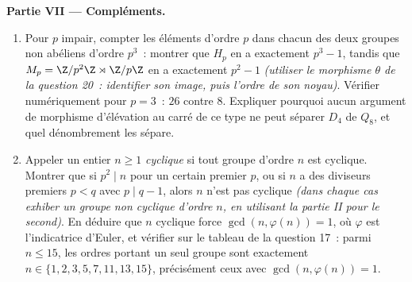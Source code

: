 \begin{problem}
\medskip
\noindent\textbf{Partie VII --- Compléments.}
\begin{enumerate}[resume]
  \item Pour $p$ impair, compter les éléments d'ordre $p$ dans
        chacun des deux groupes non abéliens d'ordre $p^3$~:
        montrer que $H_p$ en a exactement $p^3 - 1$, tandis que
        $M_p = \Z/p^2\Z \rtimes \Z/p\Z$ en a exactement $p^2 - 1$
        \emph{(utiliser le morphisme $\theta$ de la question 20~:
        identifier son image, puis l'ordre de son noyau)}.
        Vérifier numériquement pour $p = 3$~: $26$ contre $8$.
        Expliquer pourquoi aucun argument de morphisme d'élévation
        au carré de ce type ne peut séparer $D_4$ de $Q_8$, et
        quel dénombrement les sépare.
  \item Appeler un entier $n \geq 1$ \emph{cyclique} si tout
        groupe d'ordre $n$ est cyclique. Montrer que si $p^2 \mid
        n$ pour un certain premier $p$, ou si $n$ a des diviseurs
        premiers $p < q$ avec $p \mid q - 1$, alors $n$ n'est pas
        cyclique \emph{(dans chaque cas exhiber un groupe non
        cyclique d'ordre $n$, en utilisant la partie II pour le
        second)}. En déduire que $n$ cyclique force $\gcd(n,
        \varphi(n)) = 1$, où $\varphi$ est l'indicatrice d'Euler,
        et vérifier sur le tableau de la question 17~: parmi $n
        \leq 15$, les ordres portant un seul groupe sont
        exactement $n \in \{1, 2, 3, 5, 7, 11, 13, 15\}$,
        précisément ceux avec $\gcd(n, \varphi(n)) = 1$.
\end{enumerate}
\end{problem}
